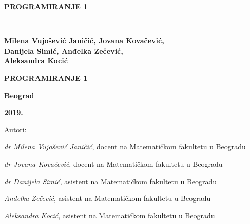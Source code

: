 \pagestyle{empty}

\vspace*{20pt}
\centerline{{\large\bfseries PROGRAMIRANJE 1} \vspace*{2mm}}
\newpage
\verb" "
\newpage
\begin{center}
{\sffamily


\vspace*{1cm}

{\fontsize{16pt}{19pt}\selectfont \bfseries  Milena Vujošević Janičić, Jovana Kovačević,\\ 
Danijela Simić, Anđelka Zečević, \\
Aleksandra Kocić}

\vspace{50pt}
\centerline{{\huge\bfseries PROGRAMIRANJE 1} \vspace*{2mm}}
\centerline{{\huge\bfseries {\fontsize{22pt}{26pt}\selectfont {Zbirka zadataka }}}}


\vspace{8cm}

\centerline{{\Large \bfseries Beograd}}
\centerline{{\Large \bfseries 2019.}}

}
\end{center}



\newpage


\small

\noindent
Autori: 

\noindent
{\slshape dr Milena Vujošević Janičić}, docent na Matematičkom fakultetu u Beogradu

\noindent
{\slshape dr Jovana Kovačević}, docent na Matematičkom fakultetu u Beogradu

\noindent
{\slshape dr Danijela Simić}, asistent na Matematičkom fakultetu u Beogradu

\noindent
{\slshape Anđelka Zečević}, asistent na Matematičkom fakultetu u Beogradu

\noindent
{\slshape Aleksandra Kocić}, asistent na Matematičkom fakultetu u Beogradu

